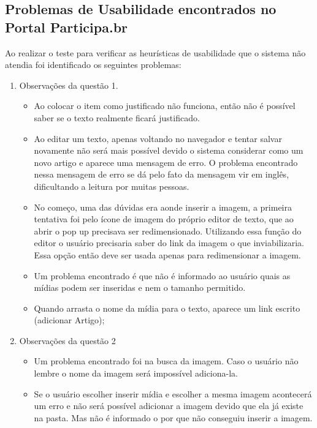 	\subsection{Problemas de Usabilidade encontrados no Portal Participa.br}


	Ao realizar o teste para verificar as heurísticas de usabilidade que o sistema não atendia foi identificado os seguintes problemas:

	
	\begin{enumerate}
		\item Observações da questão 1.
		\begin{itemize}
			\item Ao colocar o item como justificado não funciona, então não é possível saber se o texto realmente ficará justificado. 
			\item Ao editar um texto, apenas voltando no navegador e tentar salvar novamente não será mais possível devido o sistema considerar como um novo artigo e aparece uma mensagem de erro. O problema encontrado nessa mensagem de erro se dá pelo fato da mensagem 
vir em inglês, dificultando a leitura por muitas pessoas. 
			\item No começo, uma das dúvidas era aonde inserir a imagem, a primeira tentativa foi pelo ícone de imagem do próprio editor de texto, que ao abrir o pop up precisava ser redimensionado. Utilizando essa função do editor o usuário precisaria saber do link da imagem o que inviabilizaria. Essa opção então deve ser usada apenas para redimensionar a imagem.
			\item Um problema encontrado é que não é informado ao usuário quais as mídias podem ser inseridas e nem o tamanho permitido.
			\item Quando arrasta o nome da mídia para o texto, aparece um link escrito (adicionar Artigo);
		\end{itemize}
		\item Observações da questão 2

		\begin{itemize}
			\item Um problema encontrado foi na busca da imagem. Caso o usuário não lembre o nome da imagem será impossível adiciona-la.
			\item Se o usuário escolher inserir mídia e escolher a mesma imagem acontecerá um erro e não será possível adicionar a imagem devido que ela já existe na pasta. Mas não é informado o por que não conseguiu inserir a imagem.
		\end{itemize}


\end{enumerate}
